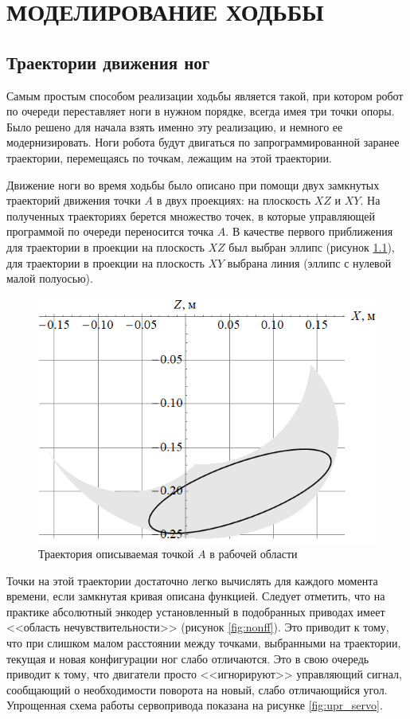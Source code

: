 \chapter{\MakeUppercase{Моделирование ходьбы}}
\section{Траектории движения ног}

Самым простым способом реализации ходьбы является такой, при котором робот по очереди переставляет ноги в нужном порядке, всегда имея три точки опоры. Было решено для начала взять именно эту реализацию, и немного ее модернизировать. Ноги робота будут двигаться по запрограммированной заранее траектории, перемещаясь по точкам, лежащим на этой траектории.

Движение ноги во время ходьбы было описано при помощи двух замкнутых траекторий движения точки $ A $ в двух проекциях: на плоскость $ XZ $ и $ XY $. На полученных траекториях берется множество точек, в которые управляющей программой по очереди переносится точка $A$. В качестве первого приближения для траектории в проекции на плоскость $ XZ $ был выбран эллипс (рисунок \ref{fig:traj1}), для траектории в проекции на плоскость $ XY $ выбрана линия (эллипс с нулевой малой полуосью).

\begin{figure}[h]
    \centering
    \includegraphics[scale=0.6]{chapter_walking_model/figure8.png}
    \caption{Траектория описываемая точкой $A$ в рабочей области}
    \label{fig:traj1}
\end{figure}

Точки на этой траектории достаточно легко вычислять для каждого момента времени, если замкнутая кривая описана функцией. Следует отметить, что на практике абсолютный энкодер установленный в подобранных приводах имеет <<область нечувствительности>> (рисунок \ref{fig:nonff}). Это приводит к тому, что при слишком малом расстоянии между точками, выбранными на траектории, текущая и новая конфигурации ног слабо отличаются. Это в свою очередь приводит к тому, что двигатели просто <<игнорируют>> управляющий сигнал, сообщающий о необходимости поворота на новый, слабо отличающийся угол. Упрощенная схема работы сервопривода показана на рисунке \ref{fig:upr_servo}.

